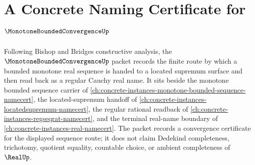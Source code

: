 \chapter{A Concrete Naming Certificate for $\MonotoneBoundedConvergenceUp$}
\label{ch:concrete-instances-monotone-bounded-convergence-namecert}

Following Bishop and Bridges constructive analysis, the $\MonotoneBoundedConvergenceUp$ packet records the finite route by which a bounded monotone real sequence is handed to a located supremum surface and then read back as a regular Cauchy real name. It sits beside the monotone bounded sequence carrier of \autoref{ch:concrete-instances-monotone-bounded-sequence-namecert}, the located-supremum handoff of \autoref{ch:concrete-instances-locatedsupremum-namecert}, the regular rational readback of \autoref{ch:concrete-instances-regseqrat-namecert}, and the terminal real-name boundary of \autoref{ch:concrete-instances-real-namecert}. The packet records a convergence certificate for the displayed sequence route; it does not claim Dedekind completeness, trichotomy, quotient equality, countable choice, or ambient completeness of $\RealUp$.

